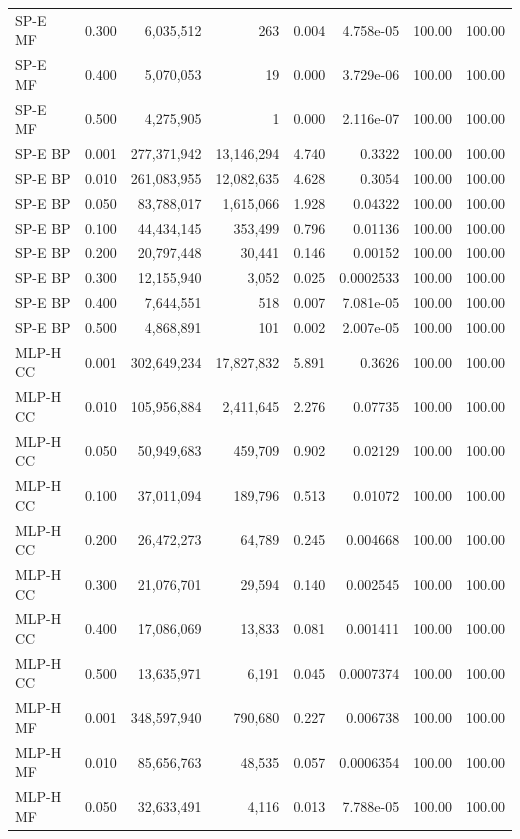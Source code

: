 \begin{longtable}{lrrrrrrr}
SP-E MF & 0.300 & 6,035,512 & 263 & 0.004 & 4.758e-05 & 100.00 & 100.00 \\
SP-E MF & 0.400 & 5,070,053 & 19 & 0.000 & 3.729e-06 & 100.00 & 100.00 \\
SP-E MF & 0.500 & 4,275,905 & 1 & 0.000 & 2.116e-07 & 100.00 & 100.00 \\
SP-E BP & 0.001 & 277,371,942 & 13,146,294 & 4.740 & 0.3322 & 100.00 & 100.00 \\
SP-E BP & 0.010 & 261,083,955 & 12,082,635 & 4.628 & 0.3054 & 100.00 & 100.00 \\
SP-E BP & 0.050 & 83,788,017 & 1,615,066 & 1.928 & 0.04322 & 100.00 & 100.00 \\
SP-E BP & 0.100 & 44,434,145 & 353,499 & 0.796 & 0.01136 & 100.00 & 100.00 \\
SP-E BP & 0.200 & 20,797,448 & 30,441 & 0.146 & 0.00152 & 100.00 & 100.00 \\
SP-E BP & 0.300 & 12,155,940 & 3,052 & 0.025 & 0.0002533 & 100.00 & 100.00 \\
SP-E BP & 0.400 & 7,644,551 & 518 & 0.007 & 7.081e-05 & 100.00 & 100.00 \\
SP-E BP & 0.500 & 4,868,891 & 101 & 0.002 & 2.007e-05 & 100.00 & 100.00 \\
MLP-H CC & 0.001 & 302,649,234 & 17,827,832 & 5.891 & 0.3626 & 100.00 & 100.00 \\
MLP-H CC & 0.010 & 105,956,884 & 2,411,645 & 2.276 & 0.07735 & 100.00 & 100.00 \\
MLP-H CC & 0.050 & 50,949,683 & 459,709 & 0.902 & 0.02129 & 100.00 & 100.00 \\
MLP-H CC & 0.100 & 37,011,094 & 189,796 & 0.513 & 0.01072 & 100.00 & 100.00 \\
MLP-H CC & 0.200 & 26,472,273 & 64,789 & 0.245 & 0.004668 & 100.00 & 100.00 \\
MLP-H CC & 0.300 & 21,076,701 & 29,594 & 0.140 & 0.002545 & 100.00 & 100.00 \\
MLP-H CC & 0.400 & 17,086,069 & 13,833 & 0.081 & 0.001411 & 100.00 & 100.00 \\
MLP-H CC & 0.500 & 13,635,971 & 6,191 & 0.045 & 0.0007374 & 100.00 & 100.00 \\
MLP-H MF & 0.001 & 348,597,940 & 790,680 & 0.227 & 0.006738 & 100.00 & 100.00 \\
MLP-H MF & 0.010 & 85,656,763 & 48,535 & 0.057 & 0.0006354 & 100.00 & 100.00 \\
MLP-H MF & 0.050 & 32,633,491 & 4,116 & 0.013 & 7.788e-05 & 100.00 & 100.00 \\

\end{longtable}
